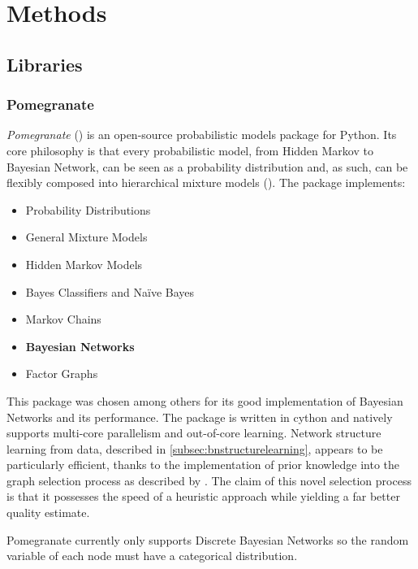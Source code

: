 
\section{Methods} 

\subsection{Libraries}\label{subsec:libraries}
\subsubsection{Pomegranate}
\textit{Pomegranate} (\cite{pomegranate}) is an open-source probabilistic models package for Python.
Its core philosophy is that every probabilistic model, from Hidden Markov to Bayesian Network, can be seen as a probability distribution and, as such, can be flexibly composed into hierarchical mixture models (\cite{Schreiber2017}).
The package implements:
\begin{itemize}
	\item Probability Distributions
	\item General Mixture Models
	\item Hidden Markov Models
	\item Bayes Classifiers and Na{\"i}ve Bayes
	\item Markov Chains
	\item \textbf{Bayesian Networks}
	\item Factor Graphs
\end{itemize} 

This package was chosen among others for its good implementation of Bayesian Networks and its performance.
The package is written in cython and natively supports multi-core parallelism and out-of-core learning.
Network structure learning from data, described in \ref{subsec:bnstructurelearning}, appears to be particularly efficient, thanks to the implementation of prior knowledge into the graph selection process as described by \cite{schreiber_noble_2017}.
The claim of this novel selection process is that it possesses the speed of a heuristic approach while yielding a far better quality estimate.

Pomegranate currently only supports Discrete Bayesian Networks so the random variable of each node must have a categorical distribution.

